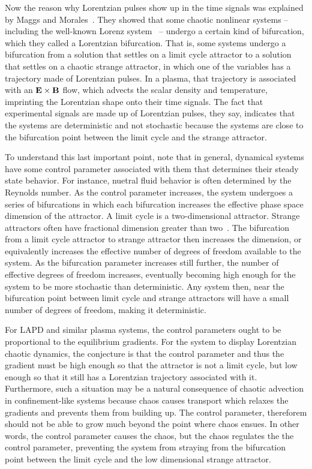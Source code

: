 Now the reason why Lorentzian pulses show up in the time signals was explained by Maggs and Morales~\cite{maggs2012a}. They showed that some chaotic nonlinear systems -- including the well-known
Lorenz system~\cite{lorenz1963} -- undergo a certain kind of bifurcation, which they called a Lorentzian bifurcation. That is, some systems undergo a bifurcation from a solution that settles
on a limit cycle attractor to a solution that settles on a chaotic strange attractor, in which one of the variables has a trajectory made of Lorentzian pulses.
In a plasma, that trajectory is associated with an ${\bf E \times B}$ flow, which advects the scalar density and temperature, imprinting the Lorentzian shape onto their time signals.
The fact that experimental signals are made up of Lorentzian pulses, they say, indicates that the systems are deterministic and not stochastic because the systems are close to the bifurcation point
between the limit cycle and the strange attractor.

To understand this last important point, note that in general, dynamical systems have some control parameter associated with them that determines their steady state behavior. For instance, 
nuetral fluid behavior is often determined by the Reynolds number. As the control parameter increases, the system undergoes a series of bifurcations in which each bifurcation increases the effective
phase space dimension of the attractor. A limit cycle is a two-dimensional attractor. Strange attractors often have fractional dimension greater than two~\cite{manneville2004}.
The bifurcation from a limit cycle attractor to strange attractor then increases the dimension, or equivalently increases the effective number of degrees of freedom available to the system.
As the bifurcation parameter increases still further, the number of effective degrees of freedom increases, eventually becoming high enough for the system to be more stochastic than deterministic.
Any system then, near the bifurcation point between limit cycle and strange attractors will have a small number of degrees of freedom, making it deterministic.

For LAPD and similar plasma systems, the control parameters ought to be proportional to the equilibrium gradients. 
For the system to display Lorentzian chaotic dynamics, the conjecture is that the control parameter and thus the gradient must be high enough so that the attractor is not
a limit cycle, but low enough so that it still has a Lorentzian trajectory associated with it.
Furthermore, such a situation may be a natural consequence of chaotic advection in confinement-like systems because chaos causes
transport which relaxes the gradients and prevents them from building up. The control parameter, thereforem should not be able to grow much beyond the point where chaos ensues. 
In other words, the control parameter
causes the chaos, but the chaos regulates the the control parameter, preventing the system from straying from the bifurcation point between the limit cycle and the low dimensional strange attractor.

